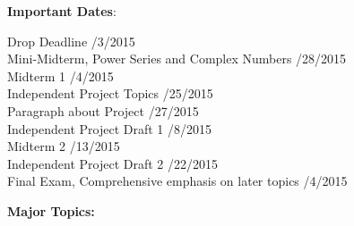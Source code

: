 \documentclass[12pt]{article}
\begin{document}
\noindent\textbf{Important Dates}:
\begin{center} \begin{minipage}{5in}
\begin{flushleft}
Drop Deadline /3/2015\\
Mini-Midterm, Power Series and Complex Numbers /28/2015\\
Midterm 1 /4/2015\\
Independent Project Topics /25/2015\\
Paragraph about Project /27/2015\\
Independent Project Draft 1 /8/2015\\
Midterm 2 /13/2015\\
Independent Project Draft 2 /22/2015\\
Final Exam, Comprehensive emphasis on later topics /4/2015\\
\end{flushleft}
\end{minipage}
\end{center}


\noindent \textbf{Major Topics:} 
\end{document}
